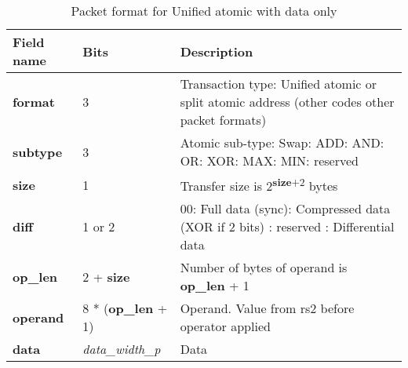 \begin{table}[htp]
  \centering
  \caption{Packet format for Unified atomic with data only}
  \label{tab:te_datadx0y7}
  \begin{tabulary}{\textwidth}{|l|p{40mm}|p{90mm}|}
    \hline
    {\bf Field name} & {\bf Bits} & {\bf Description} \\
    \hline
    \textbf{format} & 	3	& Transaction type: Unified atomic or split atomic address\newline	
		(other codes other packet formats)\\
    \hline
    \textbf{subtype} & 	3	& Atomic sub-type: Swap: ADD: AND: OR: XOR: MAX: MIN: reserved\\	
    \hline
    \textbf{size} & 1 & Transfer size is 2\textsuperscript{\textbf{size}+2} bytes\\
    \hline
    \textbf{diff} & 1 or 2 & 00: Full data (sync): Compressed data (XOR if 2 bits) : reserved : Differential data\\
    \hline
    \textbf{op\_len} & 2 + \textbf{size} & Number of bytes of operand is \textbf{op\_len} + 1\\
    \hline
    \textbf{operand}	& 8 * (\textbf{op\_len} + 1) & Operand.  Value from rs2 before operator applied\\
    \hline
    \textbf{data} & \textit{data\_width\_p} & 
                Data\\
    \hline
  \end{tabulary}
\end{table}


